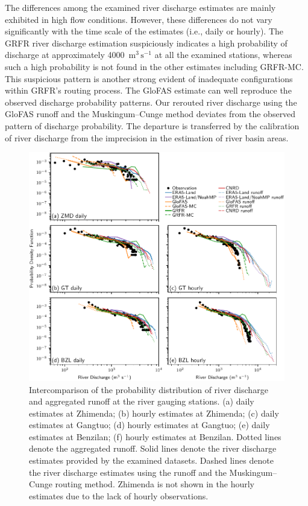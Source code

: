 \documentclass[preprint, review, authoryear, longtitle, 12pt, 3p]{elsarticle}
\begin{document}
The differences among the examined river discharge estimates are mainly exhibited in high flow conditions. However, these differences do not vary significantly with the time scale of the estimates (i.e., daily or hourly). The GRFR river discharge estimation suspiciously indicates a high probability of discharge at approximately 4000~$\mathrm{m^3\,s^{-1}}$ at all the examined stations, whereas such a high probability is not found in the other estimates including GRFR-MC. This suspicious pattern is another strong evident of inadequate configurations within GRFR's routing process. The GloFAS estimate can well reproduce the observed discharge probability patterns. Our rerouted river discharge using the GloFAS runoff and the Muskingum--Cunge method deviates from the observed pattern of discharge probability. The departure is transferred by the calibration of river discharge from the imprecision in the estimation of river basin areas.

\begin{figure}[ht!]
  \centering
  \includegraphics[width=\textwidth]{streamflow_dist_runoff.pdf}
  \caption{Intercomparison of the probability distribution of river discharge and aggregated runoff at the river gauging stations. (a) daily estimates at Zhimenda; (b) hourly estimates at Zhimenda; (c) daily estimates at Gangtuo; (d) hourly estimates at Gangtuo; (e) daily estimates at Benzilan; (f) hourly estimates at Benzilan. Dotted lines denote the aggregated runoff. Solid lines denote the river discharge estimates provided by the examined datasets. Dashed lines denote the river discharge estimates using the runoff and the Muskingum--Cunge routing method. Zhimenda is not shown in the hourly estimates due to the lack of hourly observations.}
  \label{fig:streamflow_dist}
\end{figure}
\end{document}
